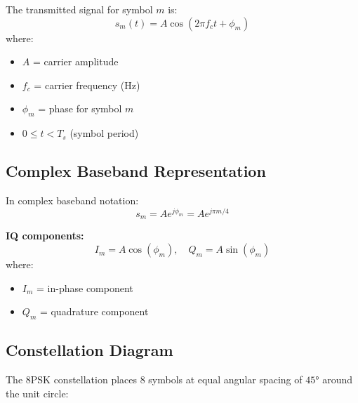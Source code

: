 The transmitted signal for symbol $m$ is:
\begin{equation}
s_m(t) = A\cos(2\pi f_c t + \phi_m)
\end{equation}
where:
\begin{itemize}
\item $A$ = carrier amplitude
\item $f_c$ = carrier frequency (Hz)
\item $\phi_m$ = phase for symbol $m$
\item $0 \leq t < T_s$ (symbol period)
\end{itemize}

\subsection{Complex Baseband Representation}

In complex baseband notation:
\begin{equation}
s_m = A e^{j\phi_m} = A e^{j\pi m/4}
\end{equation}

\textbf{IQ components:}
\begin{equation}
I_m = A\cos(\phi_m), \quad Q_m = A\sin(\phi_m)
\end{equation}
where:
\begin{itemize}
\item $I_m$ = in-phase component
\item $Q_m$ = quadrature component
\end{itemize}

\subsection{Constellation Diagram}

The 8PSK constellation places 8 symbols at equal angular spacing of $45°$ around the unit circle:

